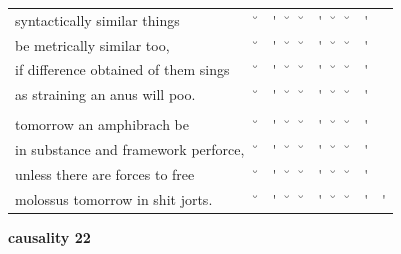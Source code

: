 \documentclass[12pt, landscape]{article}
\begin{document}
\begin{center}
\begin{tabularx}{\textwidth}{
>{\lefting\arraybackslash}X
c
c
c
c
c
c
c
c
c
}

syntactically similar things & \u{} & \'{} & \u{} & \u{} & \'{} & \u{} & \u{} & \'{} & \\
be metrically similar too, & \u{} & \'{} & \u{} & \u{} & \'{} & \u{} & \u{} & \'{} & \\
if difference obtained of them sings & \u{} & \'{} & \u{} & \u{} & \'{} & \u{} & \u{} & \'{} & \\
as straining an anus will poo. & \u{} & \'{} & \u{} & \u{} & \'{} & \u{} & \u{} & \'{} & \\
 & & & & & & & & \\
tomorrow an amphibrach be & \u{} & \'{} & \u{} & \u{} & \'{} & \u{} & \u{} & \'{} & \\
in substance and framework perforce, & \u{} & \'{} & \u{} & \u{} & \'{} & \u{} & \u{} & \'{} & \\
unless there are forces to free & \u{} & \'{} & \u{} & \u{} & \'{} & \u{} & \u{} & \'{} & \\
molossus tomorrow in shit jorts. & \u{} & \'{} & \u{} & \u{} & \'{} & \u{} & \u{} & \'{} & \'{} \\

\end{tabularx}
\end{center}

\vspace*{\fill}

\newpage

\vspace*{\fill}

\noindent \textbf{causality 22}
\noindent \hfill \par
\end{document}
